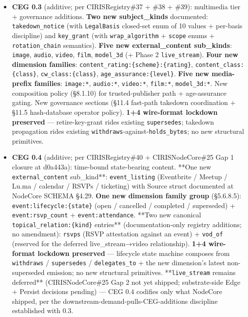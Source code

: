 \documentclass[10pt]{article}
\begin{document}
\begin{itemize}
\item \textbf{CEG 0.3} (additive; per CIRISRegistry\#37 + \#38 + \#39): multimedia tier + governance additions. \textbf{Two new subject\_kinds} documented: \texttt{takedown\_notice} (with \texttt{LegalBasis} closed-set enum of 10 values + per-basis discipline) and \texttt{key\_grant} (with \texttt{wrap\_algorithm} + \texttt{scope} enums + \texttt{rotation\_chain} semantics). \textbf{Five new external\_content sub\_kinds}: \texttt{image}, \texttt{audio}, \texttt{video}, \texttt{film}, \texttt{model\_3d} (+ Phase 2 \texttt{live\_stream}). \textbf{Four new dimension families}: \texttt{content\_rating:\{scheme\}:\{rating\}}, \texttt{content\_class:\{class\}}, \texttt{cw\_class:\{class\}}, \texttt{age\_assurance:\{level\}}. \textbf{Five new media-prefix families}: \texttt{image:*}, \texttt{audio:*}, \texttt{video:*}, \texttt{film:*}, \texttt{model\_3d:*}. New composition policy (§8.1.10) for trusted-publisher path + age-assurance gating. New governance sections (§11.4 fast-path takedown coordination + §11.5 hash-database operator policy). \textbf{1+4 wire-format lockdown preserved} — retire-key-grant rides existing \texttt{supersedes}; takedown propagation rides existing \texttt{withdraws}-against-\texttt{holds\_bytes}; no new structural primitives.
\item \textbf{CEG 0.4} (additive; per CIRISRegistry\#40 + CIRISNodeCore\#25 Gap 1 closure at d0a443a): time-bound state-bearing content. **One new \texttt{external\_content} sub\_kind**: \texttt{event\_listing} (Eventbrite / Meetup / Lu.ma / calendar / RSVPs / ticketing) with Source struct documented at NodeCore SCHEMA §4.29. \textbf{One new dimension family group} (§5.6.8.5): \texttt{event:lifecycle:\{state\}} (open / cancelled / completed / superseded) + \texttt{event:rsvp\_count} + \texttt{event:attendance}. **Two new canonical \texttt{topical\_relation:\{kind\}} entries** (documentation-only registry additions; no amendment): \texttt{rsvps} (RSVP attestation against an event) + \texttt{vod\_of} (reserved for the deferred live\_stream→video relationship). \textbf{1+4 wire-format lockdown preserved} — lifecycle state machine composes from \texttt{withdraws} / \texttt{supersedes} / \texttt{delegates\_to} + the new dimension's latest non-superseded emission; no new structural primitives. **\texttt{live\_stream} remains deferred** (CIRISNodeCore\#25 Gap 2 not yet shipped; substrate-side Edge + Persist decisions pending) — CEG 0.4 codifies only what NodeCore shipped, per the downstream-demand-pulls-CEG-additions discipline established with 0.3.

\end{itemize}
\end{document}
